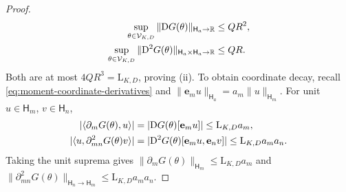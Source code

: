 \begin{proof}
\begin{equation}
\begin{aligned}
 \sup_{\theta\in\mathcal V_{K,D}}
     \|\mathrm{D} G(\theta)\|_{\mathsf H_a\to\mathbb R}&\le QR^2,\\
 \sup_{\theta\in\mathcal V_{K,D}}
     \|\mathrm{D}^2G(\theta)\|_{\mathsf H_a\times\mathsf H_a\to\mathbb R}&\le QR.
\end{aligned}
\end{equation}
Both are at most $4QR^3=\mathrm L_{K,D}$, proving (ii).
To obtain coordinate decay, recall
\eqref{eq:moment-coordinate-derivatives} and
$\|\mathbf e_m u\|_{\mathsf H_a}=a_m\|u\|_{\mathsf H_m}$.
For unit $u\in\mathsf H_m$, $v\in\mathsf H_n$,
\[
\begin{aligned}
 |\langle\partial_mG(\theta),u\rangle|
 &=|\mathrm{D} G(\theta)[\mathbf e_m u]|
   \le\mathrm L_{K,D}a_m,\\
 |\langle u,\partial_{mn}^2G(\theta)v\rangle|
 &=|\mathrm{D}^2G(\theta)[\mathbf e_m u,\mathbf e_n v]|
   \le\mathrm L_{K,D}a_ma_n.
\end{aligned}
\]
Taking the unit suprema gives
$\|\partial_mG(\theta)\|_{\mathsf H_m}\le\mathrm L_{K,D}a_m$ and
$\|\partial_{mn}^2G(\theta)\|_{\mathsf H_n\to\mathsf H_m}
\le\mathrm L_{K,D}a_ma_n$.
\end{proof}

